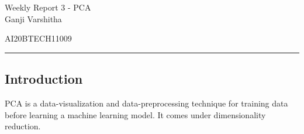 \documentclass[12pt,letterpaper, onecolumn]{exam}
\begin{document}
\newtheorem{theorem}{Theorem}[section]
\newtheorem{problem}{Problem}
\newtheorem{proposition}{Proposition}[section]
\newtheorem{lemma}{Lemma}[section]
\newtheorem{corollary}[theorem]{Corollary}
\newtheorem{example}{Example}[section]
\newtheorem{definition}[problem]{Definition}

\newcommand{\BEQA}{\begin{eqnarray}}
\newcommand{\EEQA}{\end{eqnarray}}
\newcommand{\define}{\stackrel{\triangle}{=}}

\raggedbottom
\setlength{\parindent}{0pt}
\providecommand{\mbf}{\mathbf}
\providecommand{\norm}[1]{\lVert#1\rVert}
\providecommand{\pr}[1]{\ensuremath{\Pr\left(#1\right)}}
\providecommand{\qfunc}[1]{\ensuremath{Q\left(#1\right)}}
\providecommand{\sbrak}[1]{\ensuremath{{}\left[#1\right]}}
\providecommand{\lsbrak}[1]{\ensuremath{{}\left[#1\right.}}
\providecommand{\rsbrak}[1]{\ensuremath{{}\left.#1\right]}}
\providecommand{\brak}[1]{\ensuremath{\left(#1\right)}}
\providecommand{\lbrak}[1]{\ensuremath{\left(#1\right.}}
\providecommand{\rbrak}[1]{\ensuremath{\left.#1\right)}}
\providecommand{\cbrak}[1]{\ensuremath{\left\{#1\right\}}}
\providecommand{\lcbrak}[1]{\ensuremath{\left\{#1\right.}}
\providecommand{\rcbrak}[1]{\ensuremath{\left.#1\right\}}}
\let\vec\mathbf




\begingroup  
    \centering
    
    \LARGE Weekly Report 3 - PCA\\[0.5em]
    
    \large Ganji Varshitha\par
    \large AI20BTECH11009\par
\endgroup
\rule{\textwidth}{0.4pt}
\pointsdroppedatright   %
\printanswers
\newcommand\Solution{
  \textbf{Solution:}\\}
\newcommand{\myvec}[1]{\ensuremath{\begin{bmatrix}#1\end{bmatrix}}}

 \subsection*{Introduction}
PCA is a data-visualization and data-preprocessing technique for training data before learning a machine learning model.
It comes under dimensionality reduction.
\end{document}
